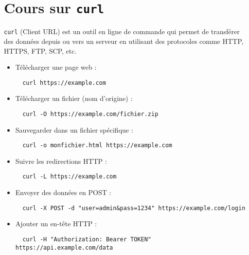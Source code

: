 \documentclass[a4paper,12pt]{article}
\begin{document}
\section*{Cours sur \texttt{curl}}

\begin{tcolorbox}[colback=blue!5,colframe=blue!75!black,title={Introduction}]
\texttt{curl} (Client URL) est un outil en ligne de commande qui permet de transférer des données depuis ou vers un serveur en utilisant des protocoles comme HTTP, HTTPS, FTP, SCP, etc.
\end{tcolorbox}

\begin{tcolorbox}[colback=blue!5,colframe=blue!75!black,title={Commandes de base}]
\begin{itemize}
  \item Télécharger une page web :
  \begin{lstlisting}
  curl https://example.com
  \end{lstlisting}

  \item Télécharger un fichier (nom d'origine) :
  \begin{lstlisting}
  curl -O https://example.com/fichier.zip
  \end{lstlisting}

  \item Sauvegarder dans un fichier spécifique :
  \begin{lstlisting}
  curl -o monfichier.html https://example.com
  \end{lstlisting}

  \item Suivre les redirections HTTP :
  \begin{lstlisting}
  curl -L https://example.com
  \end{lstlisting}

  \item Envoyer des données en POST :
  \begin{lstlisting}
  curl -X POST -d "user=admin&pass=1234" https://example.com/login
  \end{lstlisting}

  \item Ajouter un en-tête HTTP :
  \begin{lstlisting}
  curl -H "Authorization: Bearer TOKEN" https://api.example.com/data
  \end{lstlisting}
\end{itemize}
\end{tcolorbox}
\end{document}
